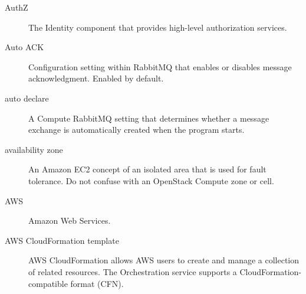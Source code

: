 \documentclass[letterpaper,10pt,english]{sphinxmanual}
\begin{document}
\begin{description}
\item[{AuthZ}] \leavevmode{}\label{_source/glossary:term-authz}
The Identity component that provides high-level
authorization services.

\item[{Auto ACK}] \leavevmode{}\label{_source/glossary:term-auto-ack}
Configuration setting within RabbitMQ that enables or disables
message acknowledgment. Enabled by default.

\item[{auto declare}] \leavevmode{}\label{_source/glossary:term-auto-declare}
A Compute RabbitMQ setting that determines whether a message
exchange is automatically created when the program starts.

\item[{availability zone}] \leavevmode{}\label{_source/glossary:term-availability-zone}
An Amazon EC2 concept of an isolated area that is used for fault
tolerance. Do not confuse with an OpenStack Compute zone or
cell.

\item[{AWS}] \leavevmode{}\label{_source/glossary:term-aws}
Amazon Web Services.

\item[{AWS CloudFormation template}] \leavevmode{}\label{_source/glossary:term-aws-cloudformation-template}
AWS CloudFormation allows AWS users to create and manage a
collection of related resources. The Orchestration service
supports a CloudFormation-compatible format (CFN).

\end{description}
\end{document}
